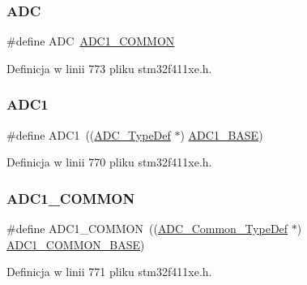 \subsubsection{\texorpdfstring{A\+DC}{ADC}}
{\footnotesize\ttfamily \#define A\+DC~\hyperlink{group___peripheral__declaration_gaf1919c64fc774aab31190346fd5457e2}{A\+D\+C1\+\_\+\+C\+O\+M\+M\+ON}}



Definicja w linii 773 pliku stm32f411xe.\+h.

\mbox{\label{group___peripheral__declaration_ga90d2d5c526ce5c0a551f533eccbee71a}} 
\subsubsection{\texorpdfstring{A\+D\+C1}{ADC1}}
{\footnotesize\ttfamily \#define A\+D\+C1~((\hyperlink{struct_a_d_c___type_def}{A\+D\+C\+\_\+\+Type\+Def} $\ast$) \hyperlink{group___peripheral__memory__map_ga695c9a2f892363a1c942405c8d351b91}{A\+D\+C1\+\_\+\+B\+A\+SE})}



Definicja w linii 770 pliku stm32f411xe.\+h.

\mbox{\label{group___peripheral__declaration_gaf1919c64fc774aab31190346fd5457e2}} 
\subsubsection{\texorpdfstring{A\+D\+C1\+\_\+\+C\+O\+M\+M\+ON}{ADC1\_COMMON}}
{\footnotesize\ttfamily \#define A\+D\+C1\+\_\+\+C\+O\+M\+M\+ON~((\hyperlink{struct_a_d_c___common___type_def}{A\+D\+C\+\_\+\+Common\+\_\+\+Type\+Def} $\ast$) \hyperlink{group___peripheral__memory__map_ga1ef44c8e4398bd3b3fbb0c981657f3d0}{A\+D\+C1\+\_\+\+C\+O\+M\+M\+O\+N\+\_\+\+B\+A\+SE})}



Definicja w linii 771 pliku stm32f411xe.\+h.

\mbox{\label{group___peripheral__declaration_ga4381bb54c2dbc34500521165aa7b89b1}} 
